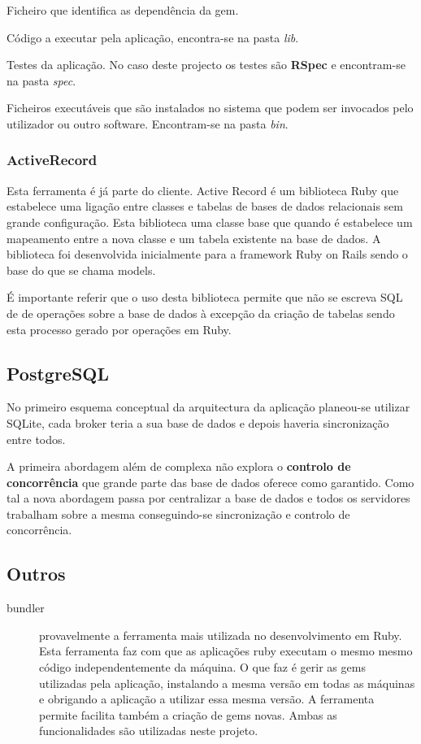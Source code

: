 \begin{description}[leftmargin=!,labelwidth=\widthof{\bfseries Código da aplicação }]
\item[Gemspec] Ficheiro que identifica as dependência da gem.
\item[Código da aplicação] Código a executar pela aplicação, encontra-se na pasta \textit{lib}.
\item[Testes] Testes da aplicação. No caso deste projecto os testes são \textbf{RSpec} e encontram-se na pasta \textit{spec}.
\item[Executáveis] Ficheiros executáveis que são instalados no sistema que podem ser invocados pelo utilizador ou outro software. Encontram-se na pasta \textit{bin}.
\end{description}


\subsubsection{ActiveRecord}
Esta ferramenta é já parte do cliente.
Active Record é um biblioteca Ruby que estabelece uma ligação entre classes e tabelas de bases de dados relacionais sem grande configuração. Esta biblioteca uma classe base que quando é estabelece um mapeamento entre a nova classe e um tabela existente na base de dados. A biblioteca foi desenvolvida inicialmente para a framework Ruby on Rails sendo o base do que se chama models.

É importante referir que o uso desta biblioteca permite que não se escreva SQL de de operações sobre a base de dados à excepção da criação de tabelas sendo esta processo gerado por operações em Ruby.

\subsection{PostgreSQL}
\label{sec:intro-postgres}
No primeiro esquema conceptual da arquitectura da aplicação planeou-se utilizar SQLite, cada broker teria a sua base de dados e depois haveria sincronização entre todos.

A primeira abordagem além de complexa não explora o \textbf{controlo de concorrência} que grande parte das base de dados oferece como garantido. Como tal a nova abordagem passa por centralizar a base de dados e todos os servidores trabalham sobre a mesma conseguindo-se sincronização e controlo de concorrência.

\subsection{Outros}
\begin{description}
\item[bundler] provavelmente a ferramenta mais utilizada no desenvolvimento em Ruby. Esta ferramenta faz com que as aplicações ruby executam o mesmo mesmo código independentemente da máquina. O que faz é gerir as gems utilizadas pela aplicação, instalando a mesma versão em todas as máquinas e obrigando a aplicação a utilizar essa mesma versão. A ferramenta permite facilita também a criação de gems novas. Ambas as funcionalidades são utilizadas neste projeto.
\end{description}

